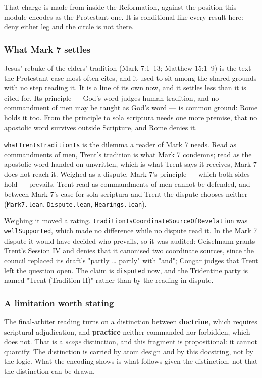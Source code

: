 \documentclass[11pt]{article}
\begin{document}
That charge is made from inside the Reformation, against the position this module encodes as the Protestant one. It is conditional like every result here: deny either leg and the circle is not there.

\subsubsection*{What Mark 7 settles}
Jesus' rebuke of the elders' tradition (Mark 7:1–13; Matthew 15:1–9) is the text the Protestant case most often cites, and it used to sit among the shared grounds with no step reading it. It is a line of its own now, and it settles less than it is cited for. Its principle — God's word judges human tradition, and no commandment of men may be taught as God's word — is common ground: Rome holds it too. From the principle to sola scriptura needs one more premise, that no apostolic word survives outside Scripture, and Rome denies it.

\texttt{what\allowbreak{}Trents\allowbreak{}Tradition\allowbreak{}Is} is the dilemma a reader of Mark 7 needs. Read as commandments of men, Trent's tradition is what Mark 7 condemns; read as the apostolic word handed on unwritten, which is what Trent says it receives, Mark 7 does not reach it. Weighed as a dispute, Mark 7's principle — which both sides hold — prevails, Trent read as commandments of men cannot be defended, and between Mark 7's case for sola scriptura and Trent the dispute chooses neither (\texttt{Mark7.lean}, \texttt{Dispute.lean}, \texttt{Hearings.lean}).

Weighing it moved a rating. \texttt{tradition\allowbreak{}Is\allowbreak{}Coordinate\allowbreak{}Source\allowbreak{}Of\allowbreak{}Revelation} was \texttt{well\allowbreak{}Supported}, which made no difference while no dispute read it. In the Mark 7 dispute it would have decided who prevails, so it was audited: Geiselmann grants Trent's Session IV and denies that it canonised two coordinate sources, since the council replaced its draft's "partly … partly" with "and"; Congar judges that Trent left the question open. The claim is \texttt{disputed} now, and the Tridentine party is named "Trent (Tradition II)" rather than by the reading in dispute.

\subsubsection*{A limitation worth stating}
The final-arbiter reading turns on a distinction between \textbf{doctrine}, which requires scriptural adjudication, and \textbf{practice} neither commanded nor forbidden, which does not. That is a \emph{scope} distinction, and this fragment is propositional: it cannot quantify. The distinction is carried by atom design and by this docstring, not by the logic. What the encoding shows is what follows given the distinction, not that the distinction can be drawn.
\end{document}
